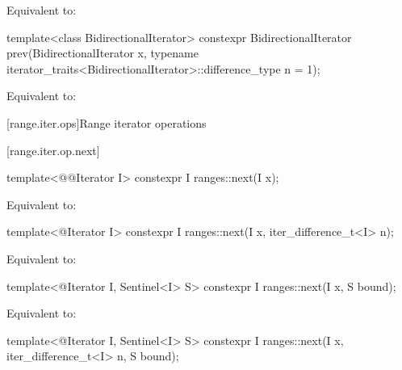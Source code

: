\documentclass{wg21}
\begin{document}
\begin{itemdescr}
	\pnum
	\effects Equivalent to: 
\end{itemdescr}

%
\begin{itemdecl}
	template<class BidirectionalIterator>
	constexpr BidirectionalIterator prev(BidirectionalIterator x,
	typename iterator_traits<BidirectionalIterator>::difference_type n = 1);
\end{itemdecl}

\begin{itemdescr}
	\pnum
	\effects Equivalent to: 
\end{itemdescr}

[range.iter.ops]{Range iterator operations}


[range.iter.op.next]{}

%
\begin{itemdecl}
	template<@@Iterator I>
	constexpr I ranges::next(I x);
\end{itemdecl}

\begin{itemdescr}
	\pnum
	\effects Equivalent to: 
\end{itemdescr}

%
\begin{itemdecl}
	template<@Iterator I>
	constexpr I ranges::next(I x, iter_difference_t<I> n);
\end{itemdecl}

\begin{itemdescr}
	\pnum
	\effects Equivalent to: 
\end{itemdescr}

%
\begin{itemdecl}
	template<@Iterator I, Sentinel<I> S>
	constexpr I ranges::next(I x, S bound);
\end{itemdecl}

\begin{itemdescr}
	\pnum
	\effects Equivalent to: 
\end{itemdescr}

%
\begin{itemdecl}
	template<@Iterator I, Sentinel<I> S>
	constexpr I ranges::next(I x, iter_difference_t<I> n, S bound);
\end{itemdecl}
\end{document}
